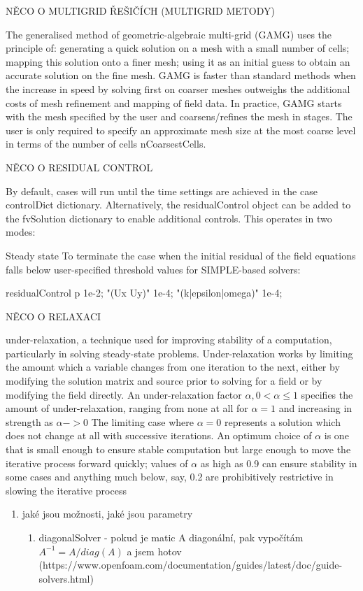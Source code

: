 \documentclass[a4paper,12pt]{report}
\theoremstyle{remark}
\begin{document}
NĚCO O MULTIGRID ŘEŠIČÍCH (MULTIGRID METODY)

The generalised method of geometric-algebraic multi-grid (GAMG) uses the principle of: generating a quick solution on a mesh with a small number of cells; mapping this solution onto a finer mesh; using it as an initial guess to obtain an accurate solution on the fine mesh. GAMG is faster than standard methods when the increase in speed by solving first on coarser meshes outweighs the additional costs of mesh refinement and mapping of field data. In practice, GAMG starts with the mesh specified by the user and coarsens/refines the mesh in stages. The user is only required to specify an approximate mesh size at the most coarse level in terms of the number of cells nCoarsestCells.


NĚCO O RESIDUAL CONTROL

By default, cases will run until the time settings are achieved in the case controlDict dictionary. Alternatively, the residualControl object can be added to the fvSolution dictionary to enable additional controls. This operates in two modes:

Steady state
To terminate the case when the initial residual of the field equations falls below user-specified threshold values for SIMPLE-based solvers:

residualControl
{
	p           1e-2;
	"(Ux Uy)"   1e-4;
	"(k|epsilon|omega)" 1e-4;
}


NĚCO O RELAXACI

under-relaxation, a technique used for improving stability of a computation, particularly in solving steady-state problems. Under-relaxation works by limiting the amount which a variable changes from one iteration to the next, either by modifying the solution matrix and source prior to solving for a field or by modifying the field directly. An under-relaxation factor $\alpha, 0 < \alpha \leq 1$  specifies the amount of under-relaxation, ranging from none at all for $\alpha = 1$  and increasing in strength as $\alpha -> 0$ The limiting case where $\alpha =  0$  represents a solution which does not change at all with successive iterations. An optimum choice of $\alpha$  is one that is small enough to ensure stable computation but large enough to move the iterative process forward quickly; values of $\alpha$   as high as 0.9 can ensure stability in some cases and anything much below, say, 0.2 are prohibitively restrictive in slowing the iterative process


\begin{enumerate}
	\item jaké jsou možnosti, jaké jsou parametry
	\begin{enumerate}
		\item     diagonalSolver - pokud je matic A diagonální, pak vypočítám $A^{-1} = A/diag(A)$ a jsem hotov (https://www.openfoam.com/documentation/guides/latest/doc/guide-solvers.html)
	\end{enumerate}
\end{enumerate}
\end{document}
